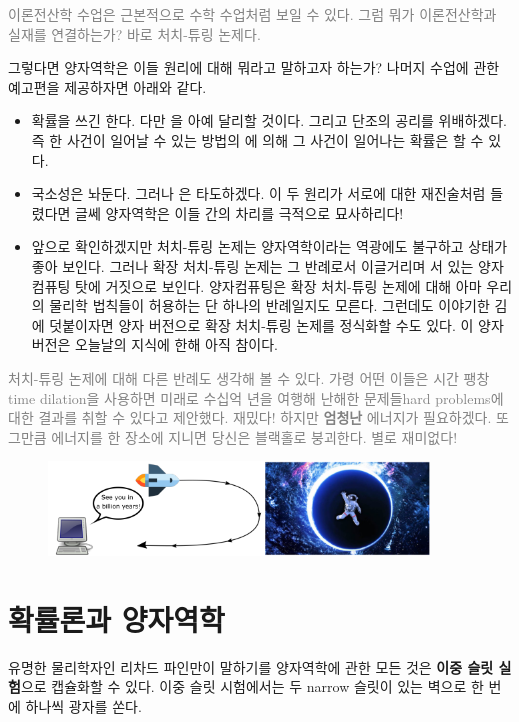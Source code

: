 \documentclass[a4paper,chapter,kosection,atbegshi,hidelinks,itemph]{oblivoir}
\begin{document}
\hfill

\hfill\parbox[t]{9cm}{\textcolor{gray}{이론전산학 수업은 근본적으로 수학 수업처럼
보일 수 있다. 그럼 뭐가 이론전산학과 실재를 연결하는가? 바로 처치-튜링 논제다.}}

\hfill\break

그렇다면 양자역학은 이들 원리에 대해 뭐라고 말하고자 하는가? 나머지 수업에 관한
예고편을 제공하자면 아래와 같다.

\hfill

\begin{itemize}[label=$\blacktriangleright$]
    \item 확률을 쓰긴 한다. 다만 을 아예
        달리할 것이다. 그리고 단조의 공리를 위배하겠다. 즉 한 사건이
        일어날 수 있는 방법의 에 의해 그 사건이 일어나는 확률은
        할 수 있다.
    \item 국소성은 놔둔다. 그러나 은 타도하겠다. 이 두
        원리가 서로에 대한 재진술처럼 들렸다면 글쎄 양자역학은 이들 간의 차리를
        극적으로 묘사하리다!
    \item 앞으로 확인하겠지만 처치-튜링 논제는 양자역학이라는 역광에도 불구하고
        상태가 좋아 보인다. 그러나 확장 처치-튜링 논제는 그 반례로서 이글거리며
        서 있는 양자컴퓨팅 탓에 거짓으로 보인다. 양자컴퓨팅은 확장 처치-튜링 
        논제에 대해 아마 우리의 물리학 법칙들이 허용하는 단 하나의 반례일지도
        모른다. 그런데도 이야기한 김에 덧붙이자면 양자 버전으로 확장 처치-튜링
        논제를 정식화할 수도 있다. 이 양자 버전은 오늘날의 지식에 한해 아직 
        참이다.
\end{itemize}

\hfill\break

\hfill\parbox[t]{9cm}{\textcolor{gray}{ 처치-튜링 논제에 대해 다른
반례도 생각해 볼 수 있다. 가령 어떤 이들은 시간 팽창{\footnotesize time 
dilation}을 사용하면 미래로 수십억 년을 여행해 난해한 문제들{\footnotesize hard
problems}에 대한 결과를 취할 수 있다고 제안했다. 재밌다! 하지만 \textbf{엄청난}
에너지가 필요하겠다. 또 그만큼 에너지를 한 장소에 지니면 당신은 블랙홀로
붕괴한다. 별로 재미없다!}}

\hfill\break

\begin{figure}[h]
    \centering
    \includegraphics[width=0.9\textwidth]{iqis1_003}
\end{figure}

\chapter{확률론과 양자역학}

유명한 물리학자인 리차드 파인만이 말하기를 양자역학에 관한 모든 것은 \textbf{이중
슬릿 실험}으로 캡슐화할 수 있다. 이중 슬릿 시험에서는 두 narrow 슬릿이 있는
벽으로 한 번에 하나씩 광자를 쏜다. 
\end{document}
